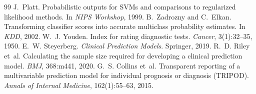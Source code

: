 \documentclass[11pt]{article}
\begin{document}
\begin{thebibliography}{99}
 J.~Platt. Probabilistic outputs for SVMs and comparisons to regularized likelihood methods. In \emph{NIPS Workshop}, 1999.
 B.~Zadrozny and C.~Elkan. Transforming classifier scores into accurate multiclass probability estimates. In \emph{KDD}, 2002.
 W.~J. Youden. Index for rating diagnostic tests. \emph{Cancer}, 3(1):32--35, 1950.
 E.~W. Steyerberg. \emph{Clinical Prediction Models}. Springer, 2019.
 R.~D. Riley et~al. Calculating the sample size required for developing a clinical prediction model. \emph{BMJ}, 368:m441, 2020.
 G.~S. Collins et~al. Transparent reporting of a multivariable prediction model for individual prognosis or diagnosis (TRIPOD). \emph{Annals of Internal Medicine}, 162(1):55--63, 2015.
\end{thebibliography}
\end{document}

